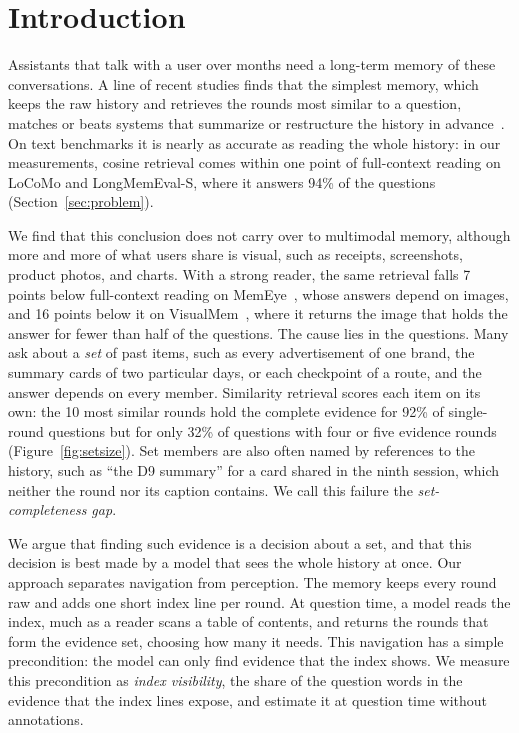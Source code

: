 \section{Introduction}
\label{sec:intro}

Assistants that talk with a user over months need a long-term memory of these conversations. A line of recent studies finds that the simplest memory, which keeps the raw history and retrieves the rounds most similar to a question, matches or beats systems that summarize or restructure the history in advance~\citep{bao2026rawrag,zhou2026explicit,sharma2026selection,peng2026memorytax}. On text benchmarks it is nearly as accurate as reading the whole history: in our measurements, cosine retrieval comes within one point of full-context reading on LoCoMo and LongMemEval-S, where it answers 94\% of the questions (Section~\ref{sec:problem}).

We find that this conclusion does not carry over to multimodal memory, although more and more of what users share is visual, such as receipts, screenshots, product photos, and charts. With a strong reader, the same retrieval falls 7 points below full-context reading on MemEye~\citep{guo2026memeye}, whose answers depend on images, and 16 points below it on VisualMem~\citep{nguyen2026personalvisual}, where it returns the image that holds the answer for fewer than half of the questions. The cause lies in the questions. Many ask about a \emph{set} of past items, such as every advertisement of one brand, the summary cards of two particular days, or each checkpoint of a route, and the answer depends on every member. Similarity retrieval scores each item on its own: the 10 most similar rounds hold the complete evidence for 92\% of single-round questions but for only 32\% of questions with four or five evidence rounds (Figure~\ref{fig:setsize}). Set members are also often named by references to the history, such as ``the D9 summary'' for a card shared in the ninth session, which neither the round nor its caption contains. We call this failure the \emph{set-completeness gap}.

We argue that finding such evidence is a decision about a set, and that this decision is best made by a model that sees the whole history at once. Our approach separates navigation from perception. The memory keeps every round raw and adds one short index line per round. At question time, a model reads the index, much as a reader scans a table of contents, and returns the rounds that form the evidence set, choosing how many it needs. This navigation has a simple precondition: the model can only find evidence that the index shows. We measure this precondition as \emph{index visibility}, the share of the question words in the evidence that the index lines expose, and estimate it at question time without annotations.

